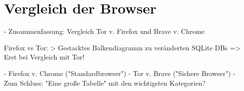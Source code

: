 \chapter{Vergleich der Browser}

- Zusammenfassung: Vergleich Tor v. Firefox und Brave v. Chrome

Firefox vs Tor:
	> Gestacktes Balkendiagramm zu veränderten SQLite DBs => Erst bei Vergleich mit Tor!


- Firefox v. Chrome ("Standardbrowser")
- Tor v. Brave ("Sichere Browser")
- Zum Schluss: "Eine große Tabelle" mit den wichtigsten Kategorien?